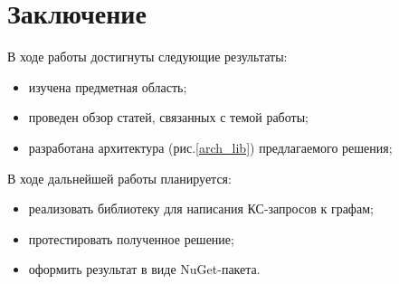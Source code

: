 \documentclass[14pt]{matmex-diploma-custom}
\begin{document}
\section{Заключение}
В ходе работы достигнуты следующие результаты:
\begin{itemize}
    \item изучена предметная область;
    \item проведен обзор статей, связанных с темой работы;
    \item разработана архитектура (рис.\ref{arch_lib}) предлагаемого решения;
\end{itemize}
        
В ходе дальнейшей работы планируется:
\begin{itemize}
    \item реализовать библиотеку для написания КС-запросов к графам;
    \item протестировать полученное решение;
    \item оформить результат в виде NuGet-пакета.
\end{itemize}
\setmonofont[Mapping=tex-text]{CMU Typewriter Text}


\end{document}
